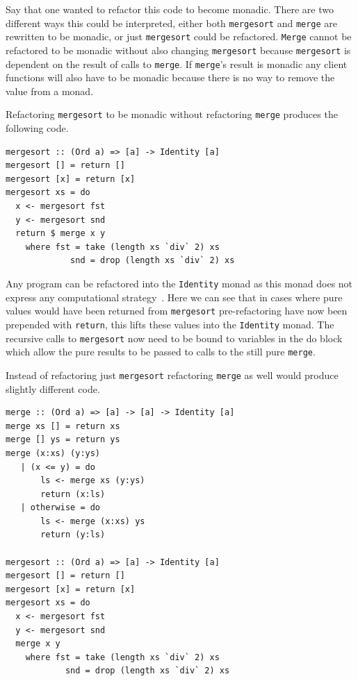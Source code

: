 Say that one wanted to refactor this code to become monadic. There are two different ways this could be interpreted, either both \texttt{mergesort} and \texttt{merge} are rewritten to be monadic, or just \texttt{mergesort} could be refactored. \texttt{Merge} cannot be refactored to be monadic without also changing \texttt{mergesort} because \texttt{mergesort} is dependent on the result of calls to \texttt{merge}. If \texttt{merge}'s result is monadic any client functions will also have to be monadic because there is no way to remove the value from a monad. 

Refactoring \texttt{mergesort} to be monadic without refactoring \texttt{merge} produces the following code.

\begin{lstlisting}[frame=tblr]
mergesort :: (Ord a) => [a] -> Identity [a]
mergesort [] = return []
mergesort [x] = return [x]
mergesort xs = do
  x <- mergesort fst
  y <- mergesort snd
  return $ merge x y
    where fst = take (length xs `div` 2) xs
             snd = drop (length xs `div` 2) xs
\end{lstlisting}  

Any program can be refactored into the \texttt{Identity} monad as this monad does not express any computational strategy~\citep{identityMonad}. Here we can see that in cases where pure values would have been returned from \texttt{mergesort} pre-refactoring have now been prepended with \texttt{return}, this lifts these values into the \texttt{Identity} monad. The recursive calls to \texttt{mergesort} now need to be bound to variables in the do block which allow the pure results to be passed to calls to the still pure \texttt{merge}.

Instead of refactoring just \texttt{mergesort} refactoring \texttt{merge} as well would produce slightly different code.

\begin{lstlisting}[frame = tblr]
merge :: (Ord a) => [a] -> [a] -> Identity [a]
merge xs [] = return xs
merge [] ys = return ys
merge (x:xs) (y:ys)
   | (x <= y) = do
       ls <- merge xs (y:ys)
       return (x:ls)
   | otherwise = do
       ls <- merge (x:xs) ys
       return (y:ls)

mergesort :: (Ord a) => [a] -> Identity [a]
mergesort [] = return []
mergesort [x] = return [x]
mergesort xs = do
  x <- mergesort fst
  y <- mergesort snd
  merge x y
    where fst = take (length xs `div` 2) xs
            snd = drop (length xs `div` 2) xs
\end{lstlisting}

